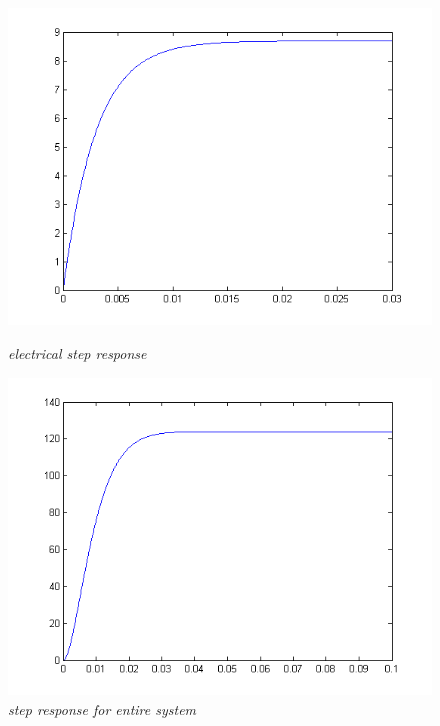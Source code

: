 \documentclass[12pt,a4paper]{article}
\begin{document}
\begin{figure}[h]
\begin{minipage}{.5\linewidth}
\centering
  \includegraphics[width=1\linewidth]{electricalsim.png}
  \caption{\emph{electrical step response}}
  \label{fig:electrical}
\end{minipage}
\begin{minipage}{.5\linewidth}
  \centering
  \includegraphics[width=1\linewidth]{fullsim.png}
  \caption{\emph{step response for entire system}}
  \label{fig:entire}
\end{minipage}
\end{figure}
\end{document}
